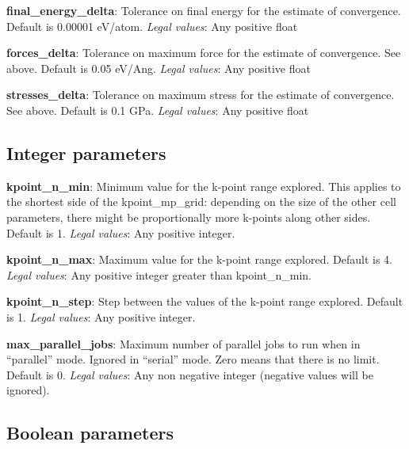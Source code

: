 \documentclass[10pt]{article}
\begin{document}
\textbf{final\_energy\_delta}: Tolerance on final energy for the estimate of convergence. Default is 0.00001 eV/atom.\newline
\textit{Legal values}: Any positive float\newline

\textbf{forces\_delta}: Tolerance on maximum force for the estimate of convergence. See above. Default is 0.05 eV/Ang.\newline
\textit{Legal values}: Any positive float\newline

\textbf{stresses\_delta}: Tolerance on maximum stress for the estimate of convergence. See above. Default is 0.1 GPa.\newline
\textit{Legal values}: Any positive float\newline

\subsection{Integer parameters}

\textbf{kpoint\_n\_min}: Minimum value for the k-point range explored. This applies to the shortest side of the kpoint\_mp\_grid: depending on the size of the other cell parameters, there might be proportionally more k-points along other sides. Default is 1.\newline
\textit{Legal values}: Any positive integer.\newline

\textbf{kpoint\_n\_max}: Maximum value for the k-point range explored. Default is 4.\newline
\textit{Legal values}: Any positive integer greater than kpoint\_n\_min.\newline

\textbf{kpoint\_n\_step}: Step between the values of the k-point range explored. Default is 1.\newline
\textit{Legal values}: Any positive integer.\newline

\textbf{max\_parallel\_jobs}: Maximum number of parallel jobs to run when in ``parallel'' mode. Ignored in ``serial'' mode. Zero means that there is no limit. Default is 0.\newline
\textit{Legal values}: Any non negative integer (negative values will be ignored).\newline

\subsection{Boolean parameters}
\end{document}
